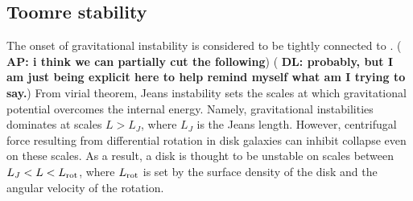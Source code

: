 \IfFileExists{emulateapjlegacy.cls}{\documentclass[iop]{emulateapjlegacy}}{\documentclass[iop]{emulateapj}}
\newcommand{\AP}[1]{({\bf \color{apcolor} AP: #1})}
\newcommand{\DL}[1]{({\bf \color{dlcolor} DL: #1})}
\begin{document}
\subsection{Toomre stability}\label{sec:Q}

The onset of gravitational instability is considered to be tightly connected to \SF \citep[e.g.,][]{Kennicutt89a, Wang94a, Li05b, Li06a}. \AP{i think we can partially cut the following} \DL{probably, but I am just being explicit here to help remind myself what am I trying to say.}
From virial theorem, Jeans instability sets the scales at which gravitational potential overcomes the internal energy. Namely, gravitational instabilities dominates at scales $L > L_J$, where $L_J$ is the Jeans length. However, centrifugal force resulting from differential rotation in disk galaxies can inhibit collapse even on these scales. As a result, a disk is thought to be unstable on scales between $L_J < L < L_{\rm rot}$, where $L_{\rm rot}$ is set by the surface density of the disk and the angular velocity of the rotation. 
\end{document}
